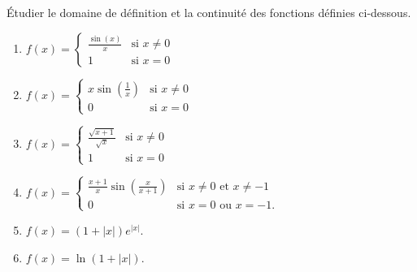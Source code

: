 
\begin{exercice}\label{exoINGE11140032}

	Étudier le domaine de définition et la continuité des fonctions définies ci-dessous.
	\begin{enumerate}

		\item
			$f(x)=\begin{cases}
				\frac{ \sin(x) }{ x }	&	\text{si }x\neq 0\\
				1	&	 \text{si }x=0
			\end{cases}
			$
		\item
			$f(x)=\begin{cases}
				x\sin(\frac{1}{ x })	&	\text{si }x\neq 0\\
				0	&	 \text{si }x=0
			\end{cases}
			$
		\item
			$f(x)=\begin{cases}
				\frac{ \sqrt{x+1} }{ \sqrt{x} }	&	\text{si }x\neq 0\\
				1	&	 \text{si }x=0
			\end{cases}
			$
		\item
			$f(x)=\begin{cases}
                \frac{ x+1 }{ x }\sin(\frac{ x }{ x+1 })	&	\text{si }x\neq 0\text{ et }x\neq -1\\
                0	&	 \text{si }x=0 \text{ ou }x=-1.
			\end{cases}
			$
		\item
			$f(x)=(1+| x |) e^{| x |}$.
		\item
			$f(x)=\ln(1+| x |)$.

	\end{enumerate}

\end{exercice}
